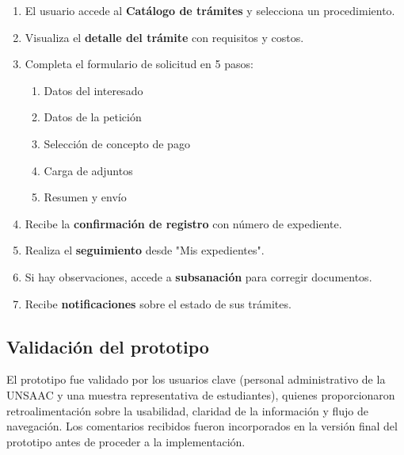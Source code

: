 \begin{enumerate}
    \item El usuario accede al \textbf{Catálogo de trámites} y selecciona un procedimiento.
    \item Visualiza el \textbf{detalle del trámite} con requisitos y costos.
    \item Completa el formulario de solicitud en 5 pasos:
        \begin{enumerate}
            \item Datos del interesado
            \item Datos de la petición
            \item Selección de concepto de pago
            \item Carga de adjuntos
            \item Resumen y envío
        \end{enumerate}
    \item Recibe la \textbf{confirmación de registro} con número de expediente.
    \item Realiza el \textbf{seguimiento} desde "Mis expedientes".
    \item Si hay observaciones, accede a \textbf{subsanación} para corregir documentos.
    \item Recibe \textbf{notificaciones} sobre el estado de sus trámites.
\end{enumerate}



\subsection{Validación del prototipo}

El prototipo fue validado por los usuarios clave (personal administrativo de la UNSAAC y una muestra representativa de estudiantes), quienes proporcionaron retroalimentación sobre la usabilidad, claridad de la información y flujo de navegación. Los comentarios recibidos fueron incorporados en la versión final del prototipo antes de proceder a la implementación.